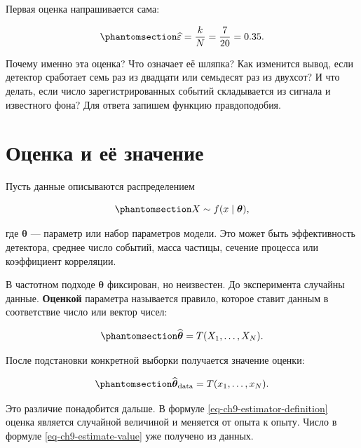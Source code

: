 \documentclass[
  russian,
  11pt,
  a4paper,
  open=any]{scrbook}
\begin{document}
Первая оценка напрашивается сама:

\begin{equation}\protect\phantomsection\label{eq-ch9-efficiency-first-estimate}{
\widehat\varepsilon=\frac{k}{N}=\frac7{20}=0.35.
}\end{equation}

Почему именно эта оценка? Что означает её шляпка? Как изменится вывод,
если детектор сработает семь раз из двадцати или семьдесят раз из
двухсот? И что делать, если число зарегистрированных событий
складывается из сигнала и известного фона? Для ответа запишем функцию
правдоподобия.

\section{Оценка и её
значение}\label{ux43eux446ux435ux43dux43aux430-ux438-ux435ux451-ux437ux43dux430ux447ux435ux43dux438ux435}

Пусть данные описываются распределением

\begin{equation}\protect\phantomsection\label{eq-ch9-statistical-model}{
X\sim f(x\mid\boldsymbol\theta),
}\end{equation}

где \(\boldsymbol\theta\) --- параметр или набор параметров модели. Это
может быть эффективность детектора, среднее число событий, масса
частицы, сечение процесса или коэффициент корреляции.

В частотном подходе \(\boldsymbol\theta\) фиксирован, но неизвестен. До
эксперимента случайны данные. \textbf{Оценкой} параметра называется
правило, которое ставит данным в соответствие число или вектор чисел:

\begin{equation}\protect\phantomsection\label{eq-ch9-estimator-definition}{
\widehat{\boldsymbol\theta}
=T(X_1,\ldots,X_N).
}\end{equation}

После подстановки конкретной выборки получается значение оценки:

\begin{equation}\protect\phantomsection\label{eq-ch9-estimate-value}{
\widehat{\boldsymbol\theta}_{\mathrm{data}}
=T(x_1,\ldots,x_N).
}\end{equation}

Это различие понадобится дальше. В формуле
\ref{eq-ch9-estimator-definition} оценка является случайной величиной и
меняется от опыта к опыту. Число в формуле \ref{eq-ch9-estimate-value}
уже получено из данных.
\end{document}
